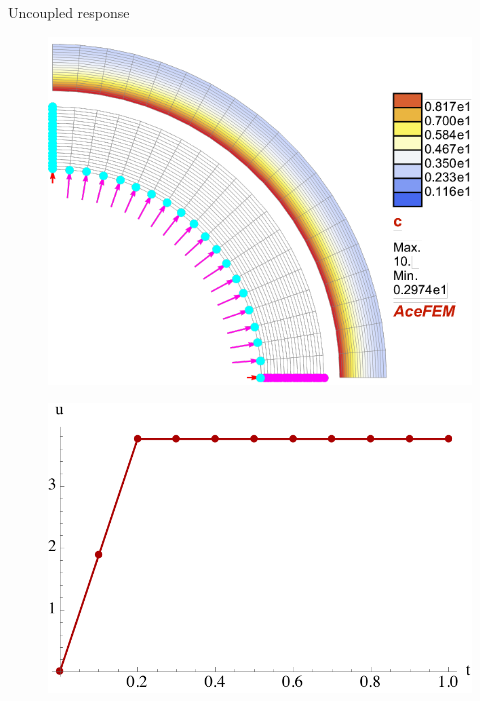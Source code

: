 \documentclass[aspectratio=169,xcolor=dvipsnames]{beamer}
\begin{document}
\begin{frame}{Uncoupled response}
\begin{figure}
\begin{minipage}{\linewidth}
\begin{minipage}{0.3\linewidth}
\end{minipage}\hfill
		\begin{minipage}{0.3\linewidth}\centering
		\includegraphics[width=\linewidth]{chemoelastic_deformed.pdf}
	\end{minipage}
	\end{minipage}
\end{figure}
\begin{figure}
	\begin{minipage}{\linewidth}
		\begin{minipage}{0.3\linewidth}\centering
			\includegraphics[width=\linewidth]{displacement_chemo.pdf}
		\end{minipage}\hfill
		\begin{minipage}{0.3\linewidth}\centering

\end{minipage}
\end{minipage}
\end{figure}
\end{frame}
\end{document}

